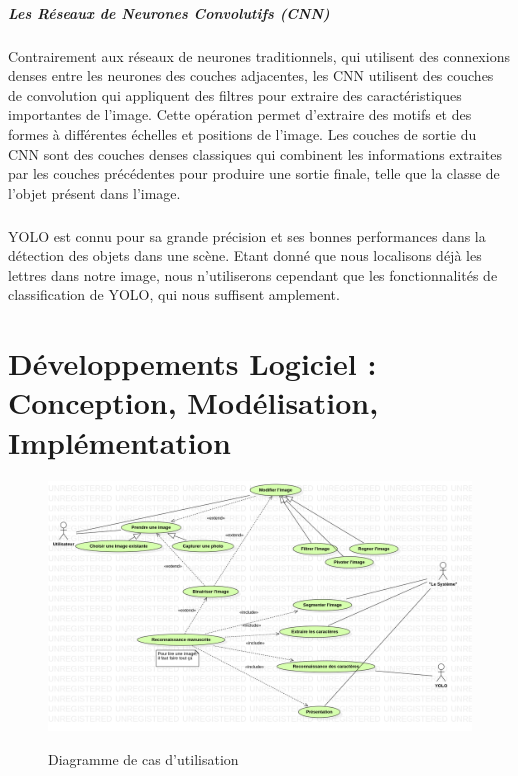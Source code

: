 \documentclass[a4paper]{article}
\begin{document}
					\subparagraph{Les Réseaux de Neurones Convolutifs (CNN)} 
					Contrairement aux réseaux de neurones traditionnels, qui utilisent des connexions denses entre les neurones des couches adjacentes, les CNN utilisent des couches de convolution qui appliquent des filtres pour extraire des caractéristiques importantes de l'image.
					Cette opération permet d'extraire des motifs et des formes à différentes échelles et positions de l'image.
					Les couches de sortie du CNN sont des couches denses classiques qui combinent les informations extraites par les couches précédentes pour produire une sortie finale, telle que la classe de l'objet présent dans l'image.

					\subparagraph{} YOLO est connu pour sa grande précision et ses bonnes performances dans la détection des objets dans une scène. Etant donné que nous localisons déjà les lettres dans notre image, nous n'utiliserons cependant que les fonctionnalités de classification de YOLO, qui nous suffisent amplement.

	\newpage
	\section{Développements Logiciel : Conception, Modélisation, Implémentation}
		\begin{figure}[h]
			\caption{Diagramme de cas d'utilisation}
			\includegraphics[width=\textwidth]{UseCaseDiagram.png}
			\centering
			\label{fig:useCaseDiagram}
		\end{figure}
\end{document}

